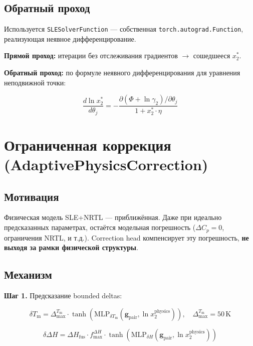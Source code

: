 \documentclass[11pt]{article}
\begin{document}
\subsection{Обратный проход}

Используется \texttt{SLESolverFunction} --- собственная \texttt{torch.autograd.Function}, реализующая неявное дифференцирование.

\textbf{Прямой проход:} итерации без отслеживания градиентов $\to$ сошедшееся $x_2^{*}$.

\textbf{Обратный проход:} по формуле неявного дифференцирования для уравнения неподвижной точки:

\begin{equation*}
\frac{d\ln x_2^{*}}{d\theta_j} = -\frac{\partial(\Phi + \ln\gamma_2)/\partial\theta_j}{1 + x_2^{*} \cdot \eta}
\end{equation*}

\section{Ограниченная коррекция (AdaptivePhysicsCorrection)}

\subsection{Мотивация}

Физическая модель SLE+NRTL --- приближённая. Даже при идеально предсказанных параметрах, остаётся модельная погрешность ($\Delta C_p = 0$, ограничения NRTL, и т.д.). Correction head компенсирует эту погрешность, \textbf{не выходя за рамки физической структуры}.

\subsection{Механизм}

\textbf{Шаг 1.} Предсказание bounded deltas:

\begin{equation*}
\delta T_{\mathrm{m}} = \Delta_{\max}^{T_{\mathrm{m}}} \cdot \tanh\!\left(\mathrm{MLP}_{\delta T_{\mathrm{m}}}(\mathbf{g}_{\mathrm{pair}}, \ln x_2^{\mathrm{physics}})\right), \quad \Delta_{\max}^{T_{\mathrm{m}}} = 50\,\mathrm{K}
\end{equation*}

\begin{equation*}
\delta \Delta H = \Delta H_{\mathrm{fus}} \cdot f_{\max}^{\Delta H} \cdot \tanh\!\left(\mathrm{MLP}_{\delta H}(\mathbf{g}_{\mathrm{pair}}, \ln x_2^{\mathrm{physics}})\right)
\end{equation*}
\end{document}
